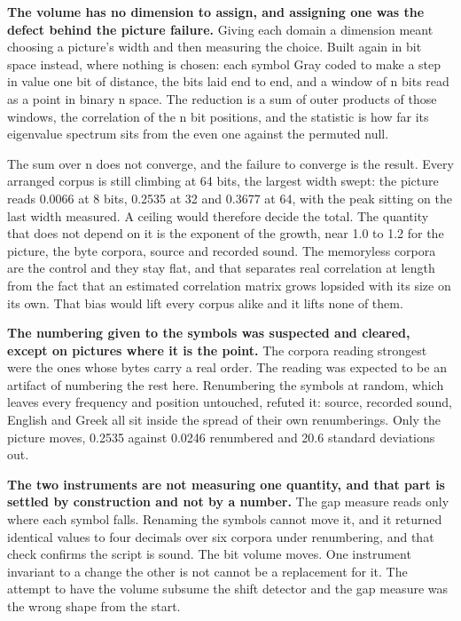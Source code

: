 \textbf{The volume has no dimension to assign, and assigning one was the defect behind the picture failure.} Giving each domain a dimension meant choosing a picture's width and then measuring the choice. Built again in bit space instead, where nothing is chosen: each symbol Gray coded to make a step in value one bit of distance, the bits laid end to end, and a window of n bits read as a point in binary n space. The reduction is a sum of outer products of those windows, the correlation of the n bit positions, and the statistic is how far its eigenvalue spectrum sits from the even one against the permuted null.

The sum over n does not converge, and the failure to converge is the result. Every arranged corpus is still climbing at 64 bits, the largest width swept: the picture reads 0.0066 at 8 bits, 0.2535 at 32 and 0.3677 at 64, with the peak sitting on the last width measured. A ceiling would therefore decide the total. The quantity that does not depend on it is the exponent of the growth, near 1.0 to 1.2 for the picture, the byte corpora, source and recorded sound. The memoryless corpora are the control and they stay flat, and that separates real correlation at length from the fact that an estimated correlation matrix grows lopsided with its size on its own. That bias would lift every corpus alike and it lifts none of them.

\textbf{The numbering given to the symbols was suspected and cleared, except on pictures where it is the point.} The corpora reading strongest were the ones whose bytes carry a real order. The reading was expected to be an artifact of numbering the rest here. Renumbering the symbols at random, which leaves every frequency and position untouched, refuted it: source, recorded sound, English and Greek all sit inside the spread of their own renumberings. Only the picture moves, 0.2535 against 0.0246 renumbered and 20.6 standard deviations out.

\textbf{The two instruments are not measuring one quantity, and that part is settled by construction and not by a number.} The gap measure reads only where each symbol falls. Renaming the symbols cannot move it, and it returned identical values to four decimals over six corpora under renumbering, and that check confirms the script is sound. The bit volume moves. One instrument invariant to a change the other is not cannot be a replacement for it. The attempt to have the volume subsume the shift detector and the gap measure was the wrong shape from the start.

